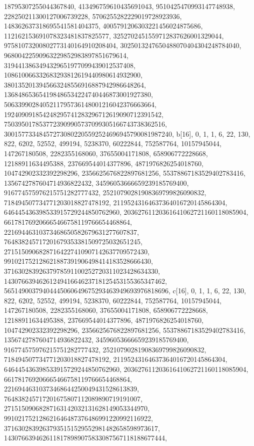 {{{   18795307255044367840, 413496759610435691043, 9510425470993147748938, 
   228250211300127006739228, 5706255282229019728923936, 
   148362637318695541581404375, 4005791206303221456024875686, 
   112162153691078323481837825577, 3252702451559712837626001329044, 
   97581073200802773140164910208404, 3025013247650488070404304248784040, 
   96800422590963229852983897851679614, 
   3194413863494329651977099439012537408, 
   108610066332683293812619440980614932900, 
   3801352013945663248556916887942986648264, 
   136848653654198486534224740446873001927380, 
   5063399028405211795736148001216042376663664, 
   192409091854248295741283296712619090712391542, 
   7503950178537723909905737099305166743738362516, 
   300157733484572730802205592524696945790081987240}}, 
 {b[16], {0, 1, 1, 6, 22, 130, 822, 6202, 52552, 499194, 5238370, 60222844, 
   752587764, 10157945044, 147267180508, 2282355168060, 37655004171808, 
   658906772228668, 12188911634495388, 237669544014377896, 
   4871976826254018760, 104742902332392298296, 2356625676822897681256, 
   55378867183529402783416, 1356742787604714936822432, 
   34596053666659239185769400, 916774575976215751282777432, 
   25210790281908369799826090832, 718494507734771203018827478192, 
   21195243164637364016720145864304, 646445436398533915729244850762960, 
   20362761120361641062721160118085904, 661781769206665466758119766654468864, 
   22169446310373468650582679631277607837, 
   764838245717201679353381509725032651245, 
   27151509068287164227410907142637709572430, 
   991021752128621887391906498414183528666430, 
   37163028392637978591100252720311023428634330, 
   1430766394626124941664623718125453155365347462, 
   56514900379404445060649675293463949693976818696}}, 
 {c[16], {0, 1, 1, 6, 22, 130, 822, 6202, 52552, 499194, 5238370, 60222844, 
   752587764, 10157945044, 147267180508, 2282355168060, 37655004171808, 
   658906772228668, 12188911634495388, 237669544014377896, 
   4871976826254018760, 104742902332392298296, 2356625676822897681256, 
   55378867183529402783416, 1356742787604714936822432, 
   34596053666659239185769400, 916774575976215751282777432, 
   25210790281908369799826090832, 718494507734771203018827478192, 
   21195243164637364016720145864304, 646445436398533915729244850762960, 
   20362761120361641062721160118085904, 661781769206665466758119766654468864, 
   22169446310373468644250049431528613839, 
   764838245717201675807112089890719191007, 
   27151509068287163142032131628149053344970, 
   991021752128621646487376486991220992116922, 
   37163028392637935151529552981482658598973617, 
   1430766394626118178989075833087567118188677444, 
}}}
